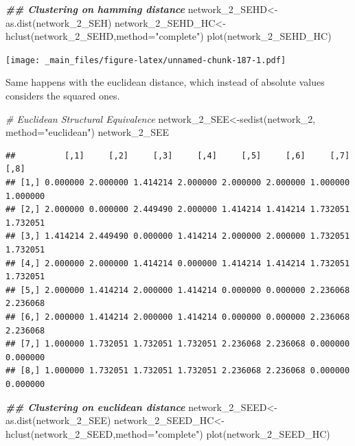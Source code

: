 \documentclass[
  notitlepage,
  onecolumn,
  openany]{book}
\newenvironment{Shaded}{\begin{snugshade}}{\end{snugshade}}
\newcommand{\AttributeTok}[1]{\textcolor[rgb]{0.77,0.63,0.00}{#1}}
\newcommand{\CommentTok}[1]{\textcolor[rgb]{0.56,0.35,0.01}{\textit{#1}}}
\newcommand{\DocumentationTok}[1]{\textcolor[rgb]{0.56,0.35,0.01}{\textbf{\textit{#1}}}}
\newcommand{\FunctionTok}[1]{\textcolor[rgb]{0.00,0.00,0.00}{#1}}
\newcommand{\NormalTok}[1]{#1}
\newcommand{\OtherTok}[1]{\textcolor[rgb]{0.56,0.35,0.01}{#1}}
\newcommand{\StringTok}[1]{\textcolor[rgb]{0.31,0.60,0.02}{#1}}
\begin{document}
\begin{Shaded}
\begin{Highlighting}[]
\DocumentationTok{\#\# Clustering on hamming distance}
\NormalTok{network\_2\_SEHD}\OtherTok{\textless{}{-}}\FunctionTok{as.dist}\NormalTok{(network\_2\_SEH)}
\NormalTok{network\_2\_SEHD\_HC}\OtherTok{\textless{}{-}}\FunctionTok{hclust}\NormalTok{(network\_2\_SEHD,}\AttributeTok{method=}\StringTok{"complete"}\NormalTok{)}
\FunctionTok{plot}\NormalTok{(network\_2\_SEHD\_HC)}
\end{Highlighting}
\end{Shaded}

\texttt{[image: \_main\_files/figure-latex/unnamed-chunk-187-1.pdf]}

Same happens with the euclidean distance, which instead of absolute values considers the squared ones.

\begin{Shaded}
\begin{Highlighting}[]
\CommentTok{\# Euclidean Structural Equivalence}
\NormalTok{network\_2\_SEE}\OtherTok{\textless{}{-}}\FunctionTok{sedist}\NormalTok{(network\_2, }\AttributeTok{method=}\StringTok{"euclidean"}\NormalTok{)}
\NormalTok{network\_2\_SEE}
\end{Highlighting}
\end{Shaded}

\begin{verbatim}
##          [,1]     [,2]     [,3]     [,4]     [,5]     [,6]     [,7]     [,8]
## [1,] 0.000000 2.000000 1.414214 2.000000 2.000000 2.000000 1.000000 1.000000
## [2,] 2.000000 0.000000 2.449490 2.000000 1.414214 1.414214 1.732051 1.732051
## [3,] 1.414214 2.449490 0.000000 1.414214 2.000000 2.000000 1.732051 1.732051
## [4,] 2.000000 2.000000 1.414214 0.000000 1.414214 1.414214 1.732051 1.732051
## [5,] 2.000000 1.414214 2.000000 1.414214 0.000000 0.000000 2.236068 2.236068
## [6,] 2.000000 1.414214 2.000000 1.414214 0.000000 0.000000 2.236068 2.236068
## [7,] 1.000000 1.732051 1.732051 1.732051 2.236068 2.236068 0.000000 0.000000
## [8,] 1.000000 1.732051 1.732051 1.732051 2.236068 2.236068 0.000000 0.000000
\end{verbatim}

\begin{Shaded}
\begin{Highlighting}[]
\DocumentationTok{\#\# Clustering on euclidean distance}
\NormalTok{network\_2\_SEED}\OtherTok{\textless{}{-}}\FunctionTok{as.dist}\NormalTok{(network\_2\_SEE)}
\NormalTok{network\_2\_SEED\_HC}\OtherTok{\textless{}{-}}\FunctionTok{hclust}\NormalTok{(network\_2\_SEED,}\AttributeTok{method=}\StringTok{"complete"}\NormalTok{)}
\FunctionTok{plot}\NormalTok{(network\_2\_SEED\_HC)}
\end{Highlighting}
\end{Shaded}
\end{document}
